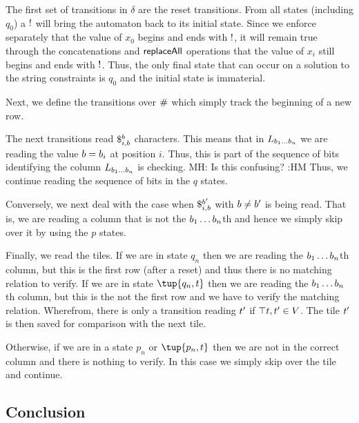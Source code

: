\documentclass{article}
\newcommand{\mat}[1]{\color{cyan} {MH: #1 :HM} \color{black}}
\begin{document}
The first set of transitions in $\delta$ are the reset transitions.
From all states (including $q_0$) a $\resetchar$ will bring the automaton back to its initial state.
Since we enforce separately that the value of $x_0$ begins and ends with $\resetchar$, it will remain true through the concatenations and $\replaceall$ operations that the value of $x_i$ still begins and ends with $\resetchar$.
Thus, the only final state that can occur on a solution to the string constraints is $q_0$ and the initial state is immaterial.

Next, we define the transitions over $\rowdelim$ which simply track the beginning of a new row.

The next transitions read
$\repl{i}{\bit}{\bit}$
characters.
This means that in
$L_{\bit_1 \ldots \bit_n}$
we are reading the value $\bit = \bit_i$ at position $i$.
Thus, this is part of the sequence of bits identifying the column
$L_{\bit_1 \ldots \bit_n}$
is checking.
\mat{Is this confusing?}
Thus, we continue reading the sequence of bits in the $q$ states.

Conversely, we next deal with the case when
$\repl{i}{\bit}{\bit'}$
with $\bit \neq \bit'$ is being read.
That is, we are reading a column that is not the
$\bit_1\ldots\bit_n$th
and hence we simply skip over it by using the $p$ states.

Finally, we read the tiles.
If we are in state $q_n$ then we are reading the
$\bit_1\ldots\bit_n$th
column, but this is the first row (after a reset) and thus there is no matching relation to verify.
If we are in state $\tup{q_n, \tile}$ then we are reading the
$\bit_1\ldots\bit_n$th
column, but this is the not the first row and we have to verify the matching relation.
Wherefrom, there is only a transition reading $\tile'$ if
$\top{\tile, \tile'} \in \vcons$.
The tile $\tile'$ is then saved for comparison with the next tile.

Otherwise, if we are in a state $p_n$ or $\tup{p_n, \tile}$ then we are not in the correct column and there is nothing to verify.
In this case we simply skip over the tile and continue.


\subsection{Conclusion}
\end{document}
